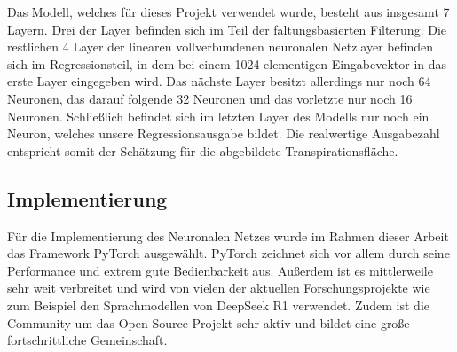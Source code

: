 \newline \par
Das Modell, welches für dieses Projekt verwendet wurde, besteht aus insgesamt 7 Layern. Drei der Layer befinden sich im Teil der faltungsbasierten Filterung. Die restlichen 4 Layer der linearen vollverbundenen neuronalen Netzlayer befinden sich im Regressionsteil, in dem bei einem 1024-elementigen Eingabevektor in das erste Layer eingegeben wird. Das nächste Layer besitzt allerdings nur noch 64 Neuronen, das darauf folgende 32 Neuronen und das vorletzte nur noch 16 Neuronen. Schließlich befindet sich im letzten Layer des Modells nur noch ein Neuron, welches unsere Regressionsausgabe bildet. Die realwertige Ausgabezahl entspricht somit der Schätzung für die abgebildete Transpirationsfläche.
\subsection{Implementierung}
Für die Implementierung des Neuronalen Netzes wurde im Rahmen dieser Arbeit das Framework PyTorch ausgewählt. PyTorch zeichnet sich vor allem durch seine Performance und extrem gute Bedienbarkeit aus. Außerdem ist es mittlerweile sehr weit verbreitet und wird von vielen der aktuellen Forschungsprojekte wie zum Beispiel den Sprachmodellen von DeepSeek R1 verwendet. Zudem ist die Community um das Open Source Projekt sehr aktiv und bildet eine große fortschrittliche Gemeinschaft.
